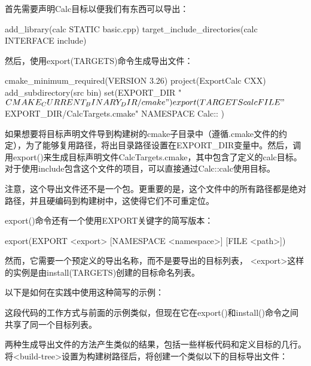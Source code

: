首先需要声明Calc目标以便我们有东西可以导出：


\begin{cmake}
add_library(calc STATIC basic.cpp)
target_include_directories(calc INTERFACE include)
\end{cmake}

然后，使用export(TARGETS)命令生成导出文件：


\begin{cmake}
cmake_minimum_required(VERSION 3.26)
project(ExportCalc CXX)
add_subdirectory(src bin)
set(EXPORT_DIR "${CMAKE_CURRENT_BINARY_DIR}/cmake")
export(TARGETS calc
    FILE "${EXPORT_DIR}/CalcTargets.cmake"
    NAMESPACE Calc::
)
\end{cmake}

如果想要将目标声明文件导到构建树的cmake子目录中（遵循.cmake文件的约定），为了能够复用路径，将出目录路径设置在EXPORT\_DIR变量中。然后，调用export()来生成目标声明文件CalcTargets.cmake，其中包含了定义的calc目标。对于使用include包含这个文件的项目，可以直接通过Calc::calc使用目标。

注意，这个导出文件还不是一个包。更重要的是，这个文件中的所有路径都是绝对路径，并且硬编码到构建树中，这使得它们不可重定位。

export()命令还有一个使用EXPORT关键字的简写版本：

\begin{shell}
export(EXPORT <export> [NAMESPACE <namespace>] [FILE <path>])
\end{shell}

然而，它需要一个预定义的导出名称，而不是要导出的目标列表， <export>这样的实例是由install(TARGETS)创建的目标命名列表。

以下是如何在实践中使用这种简写的示例：



这段代码的工作方式与前面的示例类似，但现在它在export()和install()命令之间共享了同一个目标列表。

两种生成导出文件的方法产生类似的结果，包括一些样板代码和定义目标的几行。将<build-tree>设置为构建树路径后，将创建一个类似以下的目标导出文件：

